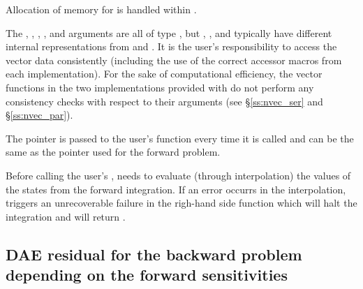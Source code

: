 {
  Allocation of memory for  is handled within {\idas}.

  The , , , , and  arguments are all 
  of type , but , , and  typically have 
  different internal representations from  and . It is the user's 
  responsibility to access the vector data consistently (including the use of the 
  correct accessor macros from each {\nvector} implementation). For the sake of 
  computational efficiency, the vector functions in the two {\nvector} implementations 
  provided with {\idas} do not perform any consistency checks with respect to their 
   arguments (see \S\ref{ss:nvec_ser} and \S\ref{ss:nvec_par}).

  The  pointer is passed to 
  the user's  function every time it is called and can be the same as the 
   pointer used for the forward problem.

  {\warn}Before calling the user's , {\idaa} needs to evaluate
  (through interpolation) the values of the states from the forward integration. 
  If an error occurrs in the interpolation, {\idaa} triggers an unrecoverable
  failure in the righ-hand side function which will halt the integration and
   will return .
}

\subsection{DAE residual for the backward problem depending on the forward sensitivities}

